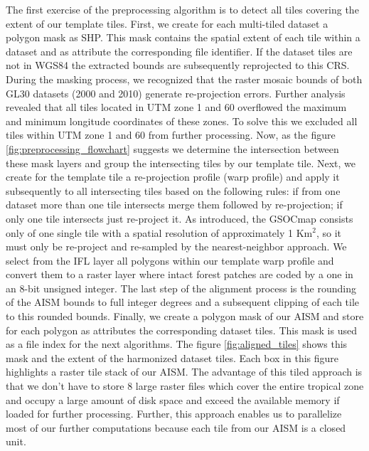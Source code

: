 		The first exercise of the preprocessing algorithm is to detect all tiles covering the extent of our template tiles. First, we create for each multi-tiled dataset a polygon mask as \ac{SHP}. This mask contains the spatial extent of each tile within a dataset and as attribute the corresponding file identifier. If the dataset tiles are not in \ac{WGS84} the extracted bounds are subsequently reprojected to this \ac{CRS}. During the masking process, we recognized that the raster mosaic bounds of both \ac{GL30} datasets (2000 and 2010) generate re-projection errors. Further analysis revealed that all tiles located in \ac{UTM} zone 1 and 60 overflowed the maximum and minimum longitude coordinates of these zones. To solve this we excluded all tiles within \ac{UTM} zone 1 and 60 from further processing. Now, as the figure \ref{fig:preprocessing_flowchart} suggests we determine the intersection between these mask layers and group the intersecting tiles by our template tile. Next, we create for the template tile a re-projection profile (warp profile) and apply it subsequently to all intersecting tiles based on the following rules: if from one dataset more than one tile intersects merge them followed by re-projection; if only one tile intersects just re-project it. As introduced, the \ac{GSOCmap} consists only of one single tile with a spatial resolution of approximately 1 Km$^2$, so it must only be re-project and re-sampled by the nearest-neighbor approach. We select from the \ac{IFL} layer all polygons within our template warp profile and convert them to a raster layer where intact forest patches are coded by a one in an 8-bit unsigned integer. The last step of the alignment process is the rounding of the \ac{AISM} bounds to full integer degrees and a subsequent clipping of each tile to this rounded bounds. Finally, we create a polygon mask of our \ac{AISM} and store for each polygon as attributes the corresponding dataset tiles. This mask is used as a file index for the next algorithms. The figure \ref{fig:aligned_tiles} shows this mask and the extent of the harmonized dataset tiles. Each box in this figure highlights a raster tile stack of our \ac{AISM}. The advantage of this tiled approach is that we don't have to store 8 large raster files which cover the entire tropical zone and occupy a large amount of disk space and exceed the available memory if loaded for further processing. Further, this approach enables us to parallelize most of our further computations because each tile from our \ac{AISM} is a closed unit.
